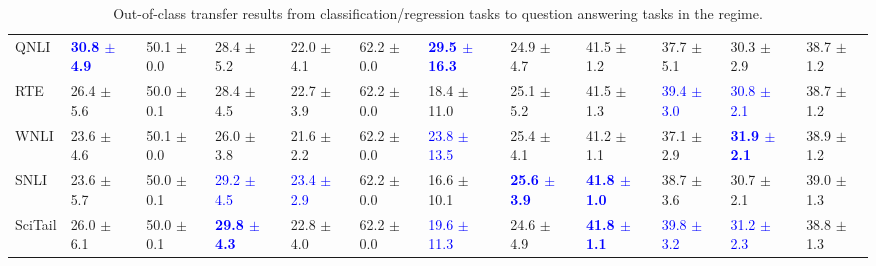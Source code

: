 \begin{landscape}
\begin{table}[t]
\begin{adjustbox}{max width=2\textwidth}
\begin{tabular}{ l l l l l  l l l l  l l l }
QNLI & \textbf{\textcolor{blue}{30.8 $\pm$ 4.9}} & 50.1 $\pm$ 0.0 & 28.4 $\pm$ 5.2 & 22.0 $\pm$ 4.1 & 62.2 $\pm$ 0.0 & \textbf{\textcolor{blue}{29.5 $\pm$ 16.3}} & 24.9 $\pm$ 4.7 & 41.5 $\pm$ 1.2 & 37.7 $\pm$ 5.1 & 30.3 $\pm$ 2.9 & 38.7 $\pm$ 1.2\\
RTE & 26.4 $\pm$ 5.6 & 50.0 $\pm$ 0.1 & 28.4 $\pm$ 4.5 & 22.7 $\pm$ 3.9 & 62.2 $\pm$ 0.0 & 18.4 $\pm$ 11.0 & 25.1 $\pm$ 5.2 & 41.5 $\pm$ 1.3 & \textcolor{blue}{39.4 $\pm$ 3.0} & \textcolor{blue}{30.8 $\pm$ 2.1} & 38.7 $\pm$ 1.2\\
WNLI & 23.6 $\pm$ 4.6 & 50.1 $\pm$ 0.0 & 26.0 $\pm$ 3.8 & 21.6 $\pm$ 2.2 & 62.2 $\pm$ 0.0 & \textcolor{blue}{23.8 $\pm$ 13.5} & 25.4 $\pm$ 4.1 & 41.2 $\pm$ 1.1 & 37.1 $\pm$ 2.9 & \textbf{\textcolor{blue}{31.9 $\pm$ 2.1}} & 38.9 $\pm$ 1.2\\
SNLI & 23.6 $\pm$ 5.7 & 50.0 $\pm$ 0.1 & \textcolor{blue}{29.2 $\pm$ 4.5} & \textcolor{blue}{23.4 $\pm$ 2.9} & 62.2 $\pm$ 0.0 & 16.6 $\pm$ 10.1 & \textbf{\textcolor{blue}{25.6 $\pm$ 3.9}} & \textbf{\textcolor{blue}{41.8 $\pm$ 1.0}} & 38.7 $\pm$ 3.6 & 30.7 $\pm$ 2.1 & 39.0 $\pm$ 1.3\\
SciTail & 26.0 $\pm$ 6.1 & 50.0 $\pm$ 0.1 & \textbf{\textcolor{blue}{29.8 $\pm$ 4.3}} & 22.8 $\pm$ 4.0 & 62.2 $\pm$ 0.0 & \textcolor{blue}{19.6 $\pm$ 11.3} & 24.6 $\pm$ 4.9 & \textbf{\textcolor{blue}{41.8 $\pm$ 1.1}} & \textcolor{blue}{39.8 $\pm$ 3.2} & \textcolor{blue}{31.2 $\pm$ 2.3} & 38.8 $\pm$ 1.3\\
\bottomrule
\end{tabular}
\end{adjustbox}
\caption{Out-of-class transfer results from classification/regression tasks to question answering tasks in the  regime.}
\label{tbla9c}
\end{table}
\end{landscape}